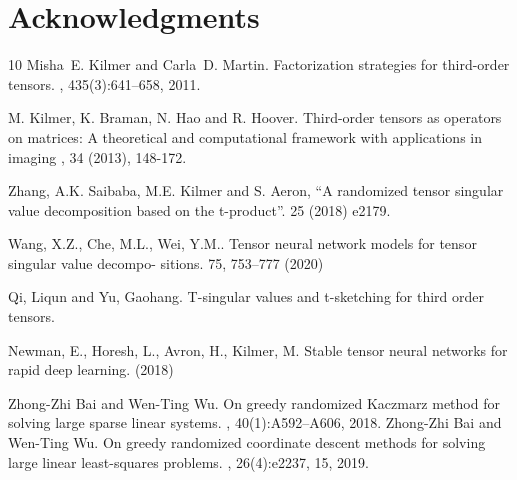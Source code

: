 \documentclass[11pt]{article}
\begin{document}
\section*{Acknowledgments}

{\small 
%
%


\begin{thebibliography}{10}
Misha~E. Kilmer and Carla~D. Martin.
\newblock Factorization strategies for third-order tensors.
, 435(3):641--658, 2011.

M. Kilmer, K. Braman, N. Hao and R. Hoover.
\newblock Third-order tensors as operators
on matrices: A theoretical and computational framework with applications in
imaging
, 34 (2013), 148-172.


Zhang, A.K. Saibaba, M.E. Kilmer and S. Aeron, 
\newblock “A randomized tensor singular
value decomposition based on the t-product”.
 25 (2018) e2179.

Wang, X.Z., Che, M.L., Wei, Y.M..
\newblock Tensor neural network models for tensor singular value decompo-
sitions. 
 75, 753–777 (2020)

Qi, Liqun and Yu, Gaohang.
\newblock T-singular values and t-sketching for third order tensors.


Newman, E., Horesh, L., Avron, H., Kilmer, M.
\newblock Stable tensor neural networks for rapid deep learning.
 (2018)

Zhong-Zhi Bai and Wen-Ting Wu.
\newblock On greedy randomized {K}aczmarz method for solving large sparse
  linear systems.
, 40(1):A592--A606, 2018.
Zhong-Zhi Bai and Wen-Ting Wu.
\newblock On greedy randomized coordinate descent methods for solving large
  linear least-squares problems.
, 26(4):e2237, 15, 2019.


\end{thebibliography}}
\end{document}
